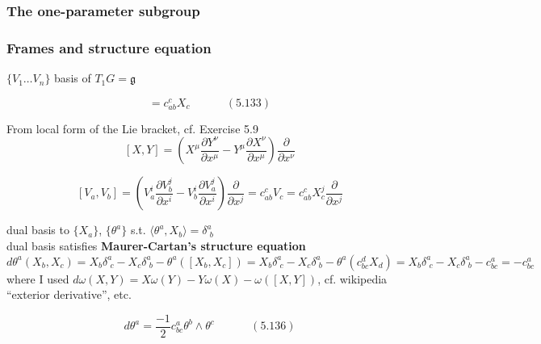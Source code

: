 \documentclass[twoside]{amsart}
\begin{document}
\subsubsection{The one-parameter subgroup }

\subsubsection{Frames and structure equation }

$\lbrace V_1 \dots V_n \rbrace$ basis of $T_1G = \mathfrak{g}$



\begin{equation}
[X_a, X_b] = c_{ab}^c X_c  \quad \quad \quad \, (5.133)
\end{equation}

From local form of the Lie bracket, cf. Exercise 5.9 
\[
[X,Y] = \left( X^{\mu} \frac{ \partial Y^{\nu}}{ \partial x^{\mu }} - Y^{\mu} \frac{ \partial X^{\nu}}{ \partial x^{\mu} } \right) \frac{ \partial }{ \partial x^{\nu}}
\]

\[
[V_a,V_b] = \left( V_a^i \frac{ \partial V_b^j}{ \partial x^i} - V_b^i \frac{ \partial V_a^j}{ \partial x^i} \right) \frac{ \partial }{ \partial x^j} = c^c_{ab}V_c = c^c_{ab} X_c^j \frac{ \partial }{ \partial x^j}
\]

dual basis to $\lbrace X_a \rbrace$, $\lbrace \theta^a \rbrace$ s.t. $\langle \theta^a, X_b \rangle = \delta^a_{ \, \, b}$ \\
dual basis satisfies \textbf{Maurer-Cartan's structure equation}
\[
d\theta^a(X_b,X_c) = X_b \delta^a_{ \, \, c} - X_c \delta^a_{ \, \, b} - \theta^a([X_b,X_c]) = X_b\delta^a_{ \, \, c} - X_c \delta^a_{ \, \, b} - \theta^a(c^d_{bc} X_d ) = X_b \delta^a_{ \, \, c} - X_c \delta^a_{ \, \, b} - c^a_{bc} = -c^a_{bc}
\]
where I used $d\omega(X,Y) = X\omega(Y) - Y\omega(X) - \omega([X,Y])$, cf. wikipedia ``exterior derivative'', etc.

\begin{equation}
  d\theta^a = \frac{-1}{2}c^a_{bc} \theta^b \wedge \theta^c \quad \quad \quad \, (5.136)
\end{equation}



\end{document}
